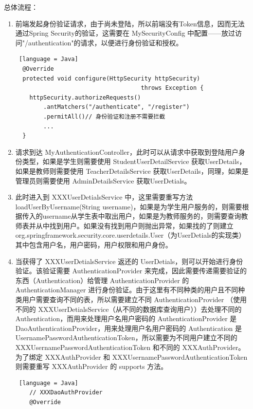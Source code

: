 \begin{enumerate}
\begin{enumerate}
\begin{enumerate}
                \end{enumerate}
        \end{enumerate}
        总体流程：
        \begin{enumerate}
          \item 前端发起身份验证请求，由于尚未登陆，所以前端没有Token信息，因而无法通过Spring Security的验证，这需要在 MySecurityConfig 中配置——放过访问"/authentication"的请求，以便进行身份验证和授权。\begin{lstlisting} [language = Java]
  @Override
  protected void configure(HttpSecurity httpSecurity)
                                    throws Exception {
    httpSecurity.authorizeRequests()
        .antMatchers("/authenticate", "/register")
        .permitAll()// 身份验证和注册不需要拦截
        ...
  }
              \end{lstlisting}
          \item 请求到达 MyAuthenticationController，此时可以从请求中获取到登陆用户身份类型，如果是学生则需要使用 StudentUserDetailService 获取UserDetails，如果是教师则需要使用 TeacherDetailsService 获取UserDetails，同理，如果是管理员则需要使用 AdminDetailsService 获取UserDetials。
          \item 此时进入到 XXXUserDetialsService 中，这里需要重写方法 loadUserByUsername(String username)，如果是为学生用户服务的，则需要根据传入的username从学生表中取出用户，如果是为教师服务的，则需要查询教师表并从中找到用户。如果没有找到用户则抛出异常，如果找的了则建立 org.springframework.security.core.userdetails.User（为UserDetials的实现类）其中包含用户名，用户密码，用户权限和用户身份。
          \item 当获得了 XXXUserDetialsService 返还的 UserDetials，则可以开始进行身份验证。该验证需要 AuthenticationProvider 来完成，因此需要传递需要验证的东西（Authentication）给管理 AuthenticationProvider 的 AuthenticationManager 进行身份验证。由于这里有不同种类的用户且不同种类用户需要查询不同的表，所以需要建立不同 AuthenticationProvider （使用不同的 XXXUserDetialsService（从不同的数据库查询用户））去处理不同的 Authentication，而用来处理用户名用户密码的 AuthenticationProvider 是 DaoAuthenticationProvider，用来处理用户名用户密码的 Authentication 是 UsernamePasswordAuthenticationToken，所以需要为不同用户建立不同的 XXXUsernamePasswordAuthenticationToken 和不同的 XXXAuthProvider。为了绑定 XXXAuthProvider 和 XXXUsernamePasswordAuthenticationToken 则需要重写 XXXAuthProvider 的 supports 方法。
                \begin{lstlisting} [language = Java]
    // XXXDaoAuthProvider
    @Override

\end{lstlisting}
\end{enumerate}
\end{enumerate}
